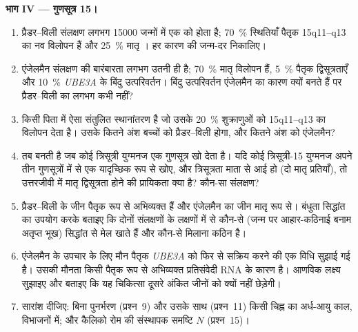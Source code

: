 \begin{problem}
\medskip
\noindent\textbf{भाग IV --- गुणसूत्र 15।}
\begin{enumerate}[resume]
  \item प्रैडर--विली संलक्षण लगभग \num{15000} जन्मों में एक को होता
        है; \qty{70}{\%} स्थितियाँ पैतृक 15q11--q13 का नव विलोपन हैं
        और \qty{25}{\%} मातृ । हर कारण की जन्म-दर
        निकालिए।
  \item एंजेलमैन संलक्षण की बारंबारता लगभग उतनी ही है; \qty{70}{\%}
        मातृ विलोपन हैं, \qty{5}{\%} पैतृक द्विसूत्रताएँ और
        \qty{10}{\%} \emph{UBE3A} के बिंदु उत्परिवर्तन। बिंदु
        उत्परिवर्तन एंजेलमैन का कारण क्यों बनते हैं पर प्रैडर--विली का
        लगभग कभी नहीं?
  \item किसी पिता में ऐसा संतुलित स्थानांतरण है जो उसके \qty{20}{\%}
        शुक्राणुओं को 15q11--q13 का विलोपन देता है। उसके कितने अंश
        बच्चों को प्रैडर--विली होगा, और कितने अंश को एंजेलमैन?
  \item {} तब बनती है जब कोई त्रिसूत्री युग्मनज एक
        गुणसूत्र खो देता है। यदि कोई त्रिसूत्री-15 युग्मनज अपने तीन
        गुणसूत्रों में से एक यादृच्छिक रूप से खोए, और त्रिसूत्रता माता
        से आई हो (दो मातृ प्रतियाँ), तो उत्तरजीवी में मातृ
        द्विसूत्रता होने की प्रायिकता क्या है? कौन-सा संलक्षण?
  \item प्रैडर--विली के जीन पैतृक रूप से अभिव्यक्त हैं और एंजेलमैन का
        जीन मातृ रूप से। बंधुता सिद्धांत का उपयोग करके बताइए कि दोनों
        संलक्षणों के लक्षणों में से कौन-से (जन्म पर आहार-कठिनाई बनाम
        अतृप्त भूख) सिद्धांत से मेल खाते हैं और कौन-से मिलाना कठिन है।
  \item एंजेलमैन के उपचार के लिए मौन पैतृक \emph{UBE3A} को फिर से
        सक्रिय करने की एक विधि सुझाई गई है। उसकी मौनता किसी पैतृक रूप
        से अभिव्यक्त प्रतिसंवेदी RNA के कारण है। आणविक लक्ष्य सुझाइए
        और बताइए कि यह चिकित्सा दूसरे अंकित जीनों को क्यों नहीं
        छेड़ेगी।
  \item सारांश दीजिए: बिना पुनर्भरण (प्रश्न~9) और उसके साथ
        (प्रश्न~11) किसी चिह्न का अर्ध-आयु काल, विभाजनों में; और
        कैलिको रोम की संस्थापक समष्टि $N$ (प्रश्न~15)।
\end{enumerate}
\end{problem}

